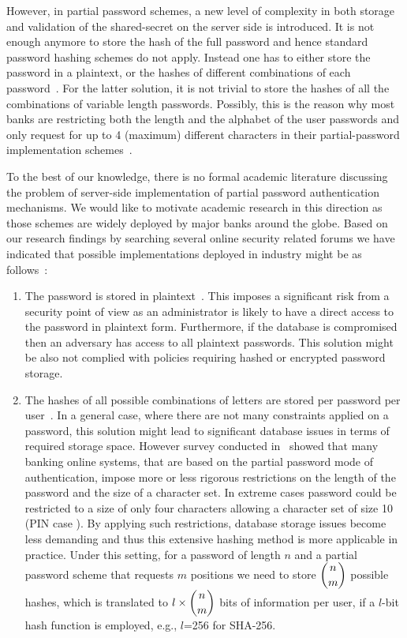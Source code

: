 \documentclass{llncs}
\begin{document}
However, in partial password schemes, a new level of complexity in both storage and validation of the shared-secret on the server side is introduced. 
It is not enough anymore to store the hash of the full password and hence standard password hashing schemes do not apply. 
Instead one has to either store the password in a plaintext, or the hashes of different combinations of each password~\cite{plynt,smartarchitects}. 
For the latter solution, it is not trivial to store the hashes of all the combinations of variable length passwords. 
Possibly, this is the reason why most banks are restricting both the length and the alphabet of the user passwords and only request for up to 4 (maximum) different characters in their partial-password implementation schemes~\cite{FC13paper}.

To the best of our knowledge, there is no formal academic literature discussing the problem of server-side implementation of partial password authentication mechanisms. 
We would like to motivate academic research in this direction as those schemes are widely deployed by major banks around the globe.  
Based on our research findings by searching several online security related forums we have indicated that possible implementations deployed in industry might be as follows~\cite{plynt,smartarchitects}:

\begin{enumerate}
  \item The password is stored in plaintext~\cite{plynt}. 
  This imposes a significant risk from a security point of view as an administrator is likely to have a direct access to the password in plaintext form. 
  Furthermore, if the database is compromised then an adversary has access to all plaintext passwords. 
  This solution might be also not complied with policies requiring hashed or encrypted password storage.
  \item The hashes of all possible combinations of letters are stored per password per user~\cite{plynt,smartarchitects}.
  In a general case, where there are not many constraints applied on a password, this solution might lead to significant database issues in terms of required storage space.
  However survey conducted in~\cite{FC13paper} showed that many banking online systems, that are based on the partial password mode of authentication, impose more or less rigorous restrictions on the length of the password and the size of a character set. 
  In extreme cases password could be restricted to a size of only four characters allowing a character set of size 10 (PIN case \cite{FC13paper}). 
  By applying such restrictions, database storage issues become less demanding and thus this extensive hashing method is more applicable in practice. 
  Under this setting, for a password of length $n$ and a partial password scheme that requests $m$ positions we need to store $\dbinom{n}{m}$ possible hashes, which is translated to $l \times \dbinom{n}{m}$ bits of information per user, if a $l$-bit hash function is employed, e.g., $l$=256 for SHA-256.  

\end{enumerate}
\end{document}
